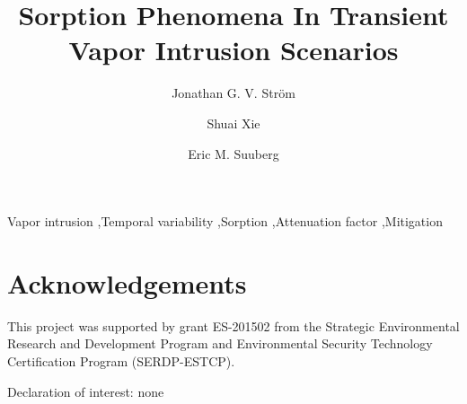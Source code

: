 \documentclass[preprint,12pt]{elsarticle}
\begin{document}
\begin{frontmatter}
\title{Sorption Phenomena In Transient Vapor Intrusion Scenarios}

\author[Brown]{Jonathan G. V. Ström}
\author[Brown]{Shuai Xie}
\author[Brown]{Eric M. Suuberg}


\address{These authors contributed equally to this work}
\address[Brown]{Brown University, School of Engineering, Providence, RI, USA}

\begin{abstract}

\end{abstract}

\begin{keyword}
  Vapor intrusion \sep Temporal variability \sep Sorption \sep Attenuation factor \sep Mitigation
\end{keyword}

\end{frontmatter}






\section*{Acknowledgements}
This project was supported by grant ES-201502 from the Strategic Environmental Research and Development Program and Environmental Security Technology Certification Program (SERDP-ESTCP).\par

Declaration of interest: none

\clearpage






\begin{comment}
Main point of this paper:

To explore how sorption affects VI transport in soils and indoor environment,
and the effect that sorption has on efficacy of mitigation systems

Outline:

Introduction:
* Why study sorption in VI?
- Many materials (significantly) sorb VI contaminants.
- No previous studies.
- May significantly affect:
-- Mitigation
-- VI investigations

* What are we gonna do to bridge till gap?
- Measure sorptive capacities at relevant concentrations. Why?
-- Isotherms non-linear w.r.t. concentration & few studies at VI relevant conditions.
-- Pick TCE (contaminant of significant concern).
- Apply results in our VI model.
-- Used extensively before
-- In lieu of a study house this will give some insights

* Outline
- Experimental setup
- Numerical model & governing equations
- Results regarding:
-- Soil transport & sorption
-- Indoor environment transport & sorption (specifically how response of c_in w.r.t. pressurization changes).
-- Reduction of mitigation system efficacy




\end{comment}
\end{document}
